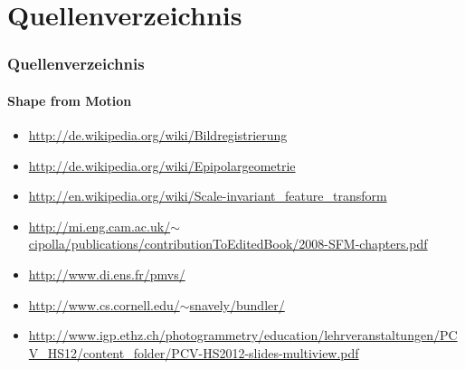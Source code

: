 \documentclass{beamer}
\begin{document}
\section{Quellenverzeichnis}
\begin{frame}
	\frametitle{Quellenverzeichnis}
	\framesubtitle{Shape from Motion}
	
	\begin{tiny}
	\begin{itemize}
		\item
		\href{http://de.wikipedia.org/wiki/Bildregistrierung}{http://de.wikipedia.org/wiki/Bildregistrierung}
		\item
		\href{http://de.wikipedia.org/wiki/Epipolargeometrie}{http://de.wikipedia.org/wiki/Epipolargeometrie}
		\item
		\href{http://en.wikipedia.org/wiki/Scale-invariant_feature_transform}{http://en.wikipedia.org/wiki/Scale-invariant\_feature\_transform}
		\item
		\href{http://mi.eng.cam.ac.uk/~cipolla/publications/contributionToEditedBook/2008-SFM-chapters.pdf}{http://mi.eng.cam.ac.uk/$\sim$cipolla/publications/contributionToEditedBook/2008-SFM-chapters.pdf}
		\item
		\href{http://www.di.ens.fr/pmvs/}{http://www.di.ens.fr/pmvs/}
		\item
		\href{http://www.cs.cornell.edu/~snavely/bundler/}{http://www.cs.cornell.edu/$\sim$snavely/bundler/}
		\item
		\href{http://www.igp.ethz.ch/photogrammetry/education/lehrveranstaltungen/PCV_HS12/content_folder/PCV-HS2012-slides-multiview.pdf}{http://www.igp.ethz.ch/photogrammetry/education/lehrveranstaltungen/PCV\_HS12/content\_folder/PCV-HS2012-slides-multiview.pdf}
	\end{itemize}
	\end{tiny}
\end{frame}
\end{document}
